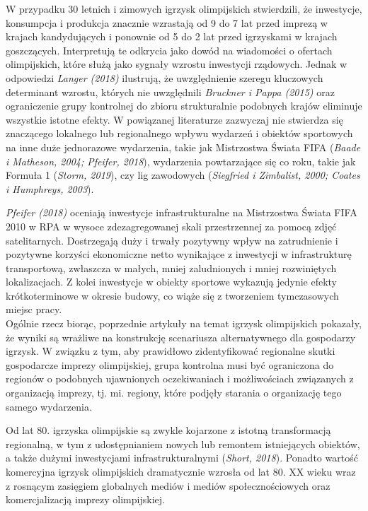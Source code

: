 \documentclass[12pt]{article}
\begin{document}
W przypadku 30 letnich i zimowych igrzysk olimpijskich stwierdzili, że inwestycje, konsumpcja i produkcja znacznie wzrastają od 9 do 7 lat przed imprezą w krajach kandydujących i ponownie od 5 do 2 lat przed igrzyskami w krajach goszczących. Interpretują te odkrycia jako dowód na wiadomości o ofertach olimpijskich, które służą jako sygnały wzrostu inwestycji rządowych. Jednak w odpowiedzi \textit{Langer (2018)} ilustrują, że uwzględnienie szeregu kluczowych determinant wzrostu, których nie uwzględnili \textit{Bruckner i Pappa (2015)} oraz ograniczenie grupy kontrolnej do zbioru strukturalnie podobnych krajów eliminuje wszystkie istotne efekty. W powiązanej literaturze zazwyczaj nie stwierdza się znaczącego lokalnego lub regionalnego wpływu wydarzeń i obiektów sportowych na inne duże jednorazowe wydarzenia, takie jak Mistrzostwa Świata FIFA (\textit{Baade i Matheson, 2004; Pfeifer, 2018}), wydarzenia powtarzające się co roku, takie jak Formuła 1 (\textit{Storm, 2019}), czy lig zawodowych (\textit{Siegfried i Zimbalist, 2000; Coates i Humphreys, 2003}).

\textit{Pfeifer (2018)} oceniają inwestycje infrastrukturalne na Mistrzostwa Świata FIFA 2010 w RPA w wysoce zdezagregowanej skali przestrzennej za pomocą zdjęć satelitarnych. Dostrzegają duży i trwały pozytywny wpływ na zatrudnienie i pozytywne korzyści ekonomiczne netto wynikające z inwestycji w infrastrukturę transportową, zwłaszcza w małych, mniej zaludnionych i mniej rozwiniętych lokalizacjach. Z kolei inwestycje w obiekty sportowe wykazują jedynie efekty krótkoterminowe w okresie budowy, co wiąże się z tworzeniem tymczasowych miejsc pracy.\\

Ogólnie rzecz biorąc, poprzednie artykuły na temat igrzysk olimpijskich pokazały, że wyniki są wrażliwe na konstrukcję scenariusza alternatywnego dla gospodarzy igrzysk. W związku z tym, aby prawidłowo zidentyfikować regionalne skutki gospodarcze imprezy olimpijskiej, grupa kontrolna musi być ograniczona do regionów o podobnych ujawnionych oczekiwaniach i możliwościach związanych z organizacją imprezy, tj. mi. regiony, które podjęły starania o organizację tego samego wydarzenia.

Od lat 80. igrzyska olimpijskie są zwykle kojarzone z istotną transformacją regionalną, w tym z udostępnianiem nowych lub remontem istniejących obiektów, a także dużymi inwestycjami infrastrukturalnymi (\textit{Short, 2018}). Ponadto wartość komercyjna igrzysk olimpijskich dramatycznie wzrosła od lat 80. XX wieku wraz z rosnącym zasięgiem globalnych mediów i mediów społecznościowych oraz komercjalizacją imprezy olimpijskiej.
\end{document}
